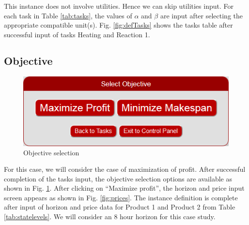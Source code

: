 This instance does not involve utilities. Hence we can skip utilities input. For each task in Table \ref{tab:tasks}, the values of $\alpha$ and $\beta$ are input after selecting the appropriate compatible unit(s). Fig. \ref{fig:defTasks} shows the tasks table after successful input of tasks Heating and Reaction 1.


\subsection{Objective}

\begin{figure}[htbp]
\centering
\includegraphics[width=0.8\linewidth]{Images/DefineObjective.png}
\caption{Objective selection}
\label{fig:selectObjective}
\end{figure}

For this case, we will consider the case of maximization of profit. After successful completion of the tasks input, the objective selection options are available as shown in Fig. \ref{fig:selectObjective}. After clicking on ``Maximize profit'', the horizon and price input screen appears as shown in Fig. \ref{fig:prices}. The instance definition is complete after input of horizon and price data for Product 1 and Product 2 from Table \ref{tab:statelevels}. We will consider an 8 hour horizon for this case study.

